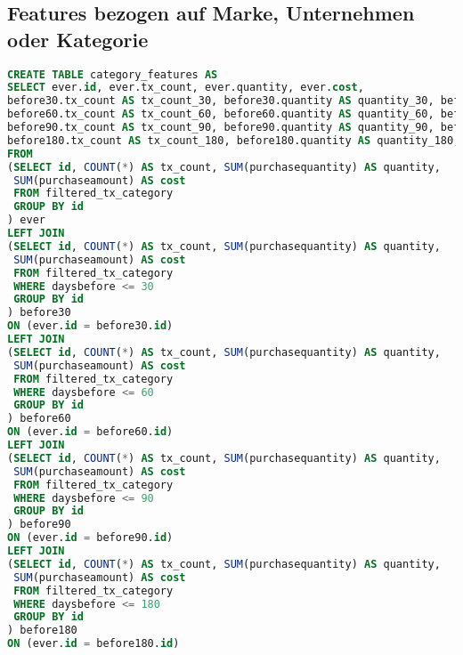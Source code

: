 \subsection{Features bezogen auf Marke, Unternehmen oder Kategorie}
\label{sql:features_bcc}
\begin{lstlisting}[language=SQL]
CREATE TABLE category_features AS
SELECT ever.id, ever.tx_count, ever.quantity, ever.cost,
before30.tx_count AS tx_count_30, before30.quantity AS quantity_30, before30.cost AS cost_30,
before60.tx_count AS tx_count_60, before60.quantity AS quantity_60, before60.cost AS cost_60,
before90.tx_count AS tx_count_90, before90.quantity AS quantity_90, before90.cost AS cost_90,
before180.tx_count AS tx_count_180, before180.quantity AS quantity_180, before180.cost AS cost_180
FROM 
(SELECT id, COUNT(*) AS tx_count, SUM(purchasequantity) AS quantity, 
 SUM(purchaseamount) AS cost
 FROM filtered_tx_category
 GROUP BY id
) ever
LEFT JOIN
(SELECT id, COUNT(*) AS tx_count, SUM(purchasequantity) AS quantity, 
 SUM(purchaseamount) AS cost
 FROM filtered_tx_category
 WHERE daysbefore <= 30
 GROUP BY id
) before30
ON (ever.id = before30.id)
LEFT JOIN
(SELECT id, COUNT(*) AS tx_count, SUM(purchasequantity) AS quantity, 
 SUM(purchaseamount) AS cost
 FROM filtered_tx_category
 WHERE daysbefore <= 60
 GROUP BY id
) before60
ON (ever.id = before60.id)
LEFT JOIN
(SELECT id, COUNT(*) AS tx_count, SUM(purchasequantity) AS quantity, 
 SUM(purchaseamount) AS cost
 FROM filtered_tx_category
 WHERE daysbefore <= 90
 GROUP BY id
) before90
ON (ever.id = before90.id)
LEFT JOIN 
(SELECT id, COUNT(*) AS tx_count, SUM(purchasequantity) AS quantity, 
 SUM(purchaseamount) AS cost
 FROM filtered_tx_category
 WHERE daysbefore <= 180
 GROUP BY id
) before180
ON (ever.id = before180.id)
\end{lstlisting}

